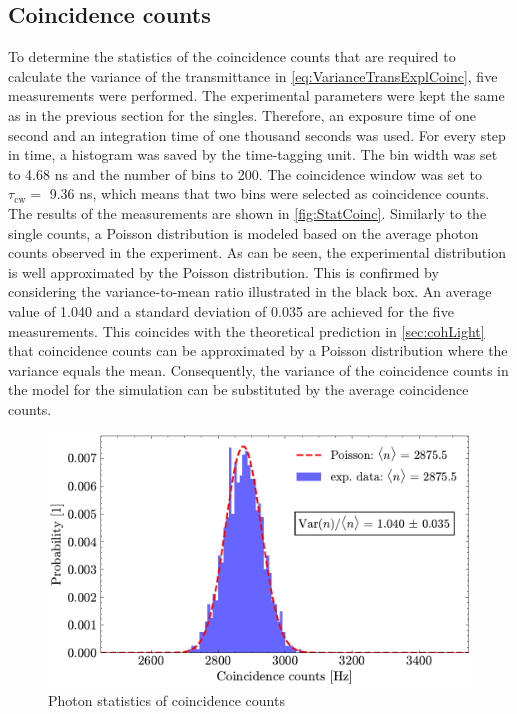 \subsection{Coincidence counts}
To determine the statistics of the coincidence counts that are required to calculate the variance of the transmittance in \autoref{eq:VarianceTransExplCoinc}, five measurements were performed. The experimental parameters were kept the same as in the previous section for the singles. Therefore, an exposure time of one second and an integration time of one thousand seconds was used. For every step in time, a histogram was saved by the time-tagging unit. The bin width was set to 4.68 ns and the number of bins to 200. The coincidence window was set to $\tau_{\text{cw}} = $ 9.36 ns, which means that two bins were selected as coincidence counts.\newline
The results of the measurements are shown in \autoref{fig:StatCoinc}. Similarly to the single counts, a Poisson distribution is modeled based on the average photon counts observed in the experiment. As can be seen, the experimental distribution is well approximated by the Poisson distribution. This is confirmed by considering the variance-to-mean ratio illustrated in the black box. An average value of 1.040 and a standard deviation of 0.035 are achieved for the five measurements. This coincides with the theoretical prediction in \autoref{sec:cohLight} that coincidence counts can be approximated by a Poisson distribution where the variance equals the mean. \newline
Consequently, the variance of the coincidence counts in the model for the simulation can be substituted by the average coincidence counts.
\begin{figure}[tb!]
	\centering
	\includegraphics[width=.9\textwidth]{Images/CoincStatistics_2.pdf}
	\caption{Photon statistics of coincidence counts}
	\label{fig:StatCoinc}
\end{figure}

